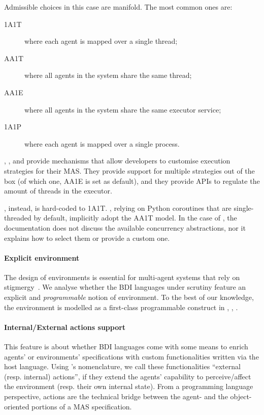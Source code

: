 Admissible choices in this case are manifold.
%
The most common ones are:
%
\begin{description}
    \item[\ac{1A1T}] where each agent is mapped over a single thread;
    \item[\ac{AA1T}] where all agents in the system share the same thread;
    \item[\ac{AA1E}] where all agents in the system share the same executor service;
    \item[\ac{1A1P}] where each agent is mapped over a single process.
\end{description}

\jason{}, \astra{}, \jadex{} and \goal{} provide mechanisms that allow developers to customise execution strategies for their \ac{MAS}.
%
They provide support for multiple strategies out of the box
(of which one,  \acs{AA1E} is set as default),
and they provide \acp{API} to regulate the amount of threads in the executor.

\phidias{},
instead, is hard-coded to \acs{1A1T}.
%
\spadebdi{},
relying on Python coroutines that are single-threaded by default\footnotemark,
implicitly adopt the \acs{AA1T} model.
%
In the case of \jack{},
the documentation does not discuss the available concurrency abstractions,
nor it explains how to select them or provide a custom one.


\paragraph{Explicit environment}
%
The design of environments
is essential for multi-agent systems that rely on stigmergy~\cite{weyns2007aamas}.
%
We analyse whether the \ac{BDI} languages under scrutiny feature an explicit and \emph{programmable} notion of environment.
%
To the best of our knowledge,
the environment is modelled as a first-class programmable construct in \jason{}, \astra{}, \goal{}.

\paragraph{Internal/External actions support}
%
This feature is about whether \ac{BDI} languages come with some means to enrich agents' or environments' specifications
with custom functionalities written via the host language.
%
Using \jason{}'s nomenclature, we call these functionalities ``external (resp. internal) actions'',
if they extend the agents' capability to perceive/affect the environment (resp. their own internal state).
%
From a programming language perspective, actions are the technical bridge between the agent- and the object-oriented portions of a \ac{MAS} specification.

